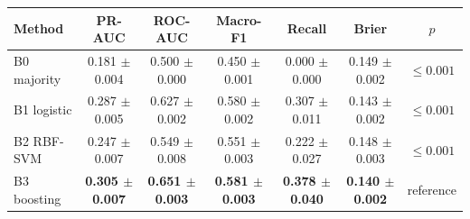 \begin{tabular}{@{}lcccccc@{}}\toprule
Method & PR-AUC & ROC-AUC & Macro-F1 & Recall & Brier & $p$ \\ \midrule
B0 majority & 0.181 $\pm$ 0.004 & 0.500 $\pm$ 0.000 & 0.450 $\pm$ 0.001 & 0.000 $\pm$ 0.000 & 0.149 $\pm$ 0.002 & $\le0.001$ \\
B1 logistic & 0.287 $\pm$ 0.005 & 0.627 $\pm$ 0.002 & 0.580 $\pm$ 0.002 & 0.307 $\pm$ 0.011 & 0.143 $\pm$ 0.002 & $\le0.001$ \\
B2 RBF-SVM & 0.247 $\pm$ 0.007 & 0.549 $\pm$ 0.008 & 0.551 $\pm$ 0.003 & 0.222 $\pm$ 0.027 & 0.148 $\pm$ 0.003 & $\le0.001$ \\
B3 boosting & \textbf{0.305 $\pm$ 0.007} & \textbf{0.651 $\pm$ 0.003} & \textbf{0.581 $\pm$ 0.003} & \textbf{0.378 $\pm$ 0.040} & \textbf{0.140 $\pm$ 0.002} & reference \\
\bottomrule\end{tabular}
